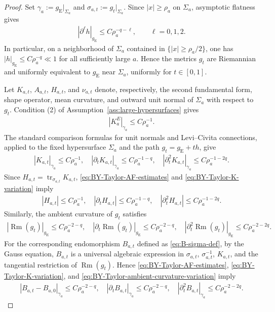 \documentclass[10pt]{amsart}
\newcommand{\gE}{g_{\mathrm{E}}}
\newcommand{\Rm}{\operatorname{Rm}}
\theoremstyle{plain}
\theoremstyle{remark}
\begin{document}
	\begin{proof}
		Set $\gamma_a:=\gE|_{\Sigma_a}$ and $\sigma_{a,t}:=g_t|_{\Sigma_a}$. Since $|x|\geq\rho_a$ on $\Sigma_a$, asymptotic flatness gives
		\begin{align}\label{eq:BY-Taylor-AF-estimates}
			|\partial^\ell h|_{\gE}
			\leq
			C\rho_a^{-q-\ell},
			\qquad
			\ell=0,1,2.
		\end{align}
		In particular, on a neighborhood of $\Sigma_a$ contained in
		$\{|x|\geq \rho_a/2\}$, one has $|h|_{\gE}\leq C\rho_a^{-q}\ll 1$ for all
		sufficiently large $a$. Hence the metrics $g_t$ are Riemannian and uniformly
		equivalent to $\gE$ near $\Sigma_a$, uniformly for $t\in[0,1]$.
		
		Let $K_{a,t}$, $A_{a,t}$, $H_{a,t}$, and $\nu_{a,t}$ denote,
		respectively, the second fundamental form, shape operator, mean curvature,
		and outward unit normal of $\Sigma_a$ with respect to $g_t$. Condition
		\textup{(2)} of Assumption~\ref{ass:large-hypersurfaces} gives
		\begin{align*}
			|K_a^E|_{\gamma_a}
			\leq
			C\rho_a^{-1}.
		\end{align*}
		The standard comparison formulas for unit normals and Levi--Civita
		connections, applied to the fixed hypersurface $\Sigma_a$ and the path
		$g_t=\gE+t h$, give
		\begin{align}\label{eq:BY-Taylor-K-variation}
			|K_{a,t}|_{\gamma_a}
			\leq
			C\rho_a^{-1},
			\quad
			|\partial_tK_{a,t}|_{\gamma_a}
			\leq
			C\rho_a^{-1-q},
			\quad
			|\partial_t^2K_{a,t}|_{\gamma_a}
			\leq
			C\rho_a^{-1-2q}.
		\end{align}
		Since $H_{a,t}=\operatorname{tr}_{\sigma_{a,t}}K_{a,t}$,
		\eqref{eq:BY-Taylor-AF-estimates} and
		\eqref{eq:BY-Taylor-K-variation} imply
		\begin{align}\label{eq:BY-Taylor-physical-H-variation}
			|H_{a,t}|
			\leq
			C\rho_a^{-1},
			\quad
			|\partial_tH_{a,t}|
			\leq
			C\rho_a^{-1-q},
			\quad
			|\partial_t^2H_{a,t}|
			\leq
			C\rho_a^{-1-2q}.
		\end{align}
		Similarly, the ambient curvature of $g_t$ satisfies
		\begin{align}\label{eq:BY-Taylor-ambient-curvature-variation}
			|\operatorname{Rm}(g_t)|_{\gE}
			\leq
			C\rho_a^{-2-q},
			\quad
			|\partial_t\operatorname{Rm}(g_t)|_{\gE}
			\leq
			C\rho_a^{-2-q},
			\quad
			|\partial_t^2\operatorname{Rm}(g_t)|_{\gE}
			\leq
			C\rho_a^{-2-2q}.
		\end{align}
		For the corresponding endomorphism $B_{a,t}$ defined as \eqref{eq:B-sigma-def}, by the Gauss equation, $B_{a,t}$ is a universal algebraic
		expression in $\sigma_{a,t}$, $\sigma_{a,t}^{-1}$, $K_{a,t}$, and the tangential restriction of $\Rm(g_t)$. Hence
		\eqref{eq:BY-Taylor-AF-estimates},
		\eqref{eq:BY-Taylor-K-variation}, and
		\eqref{eq:BY-Taylor-ambient-curvature-variation} imply
		\begin{align}\label{eq:BY-Taylor-Bendomorphism-variation}
			|B_{a,t}-B_{a,0}|_{\gamma_a}
			\leq
			C\rho_a^{-2-q},
			\quad
			|\partial_tB_{a,t}|_{\gamma_a}
			\leq
			C\rho_a^{-2-q},
			\quad
			|\partial_t^2B_{a,t}|_{\gamma_a}
			\leq
			C\rho_a^{-2-2q}.
		\end{align}
		

\end{proof}
\end{document}
